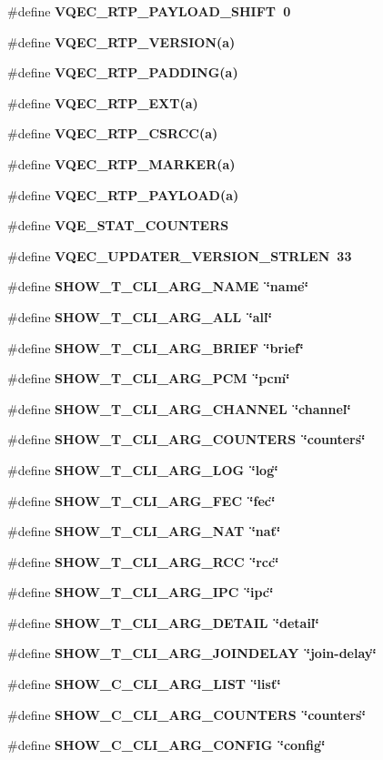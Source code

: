 \begin{CompactItemize}
\#define \bf{VQEC\_\-RTP\_\-PAYLOAD\_\-SHIFT}~0
\item 
\#define \bf{VQEC\_\-RTP\_\-VERSION}(a)
\item 
\#define \bf{VQEC\_\-RTP\_\-PADDING}(a)
\item 
\#define \bf{VQEC\_\-RTP\_\-EXT}(a)
\item 
\#define \bf{VQEC\_\-RTP\_\-CSRCC}(a)
\item 
\#define \bf{VQEC\_\-RTP\_\-MARKER}(a)
\item 
\#define \bf{VQEC\_\-RTP\_\-PAYLOAD}(a)
\item 
\#define \bf{VQE\_\-STAT\_\-COUNTERS}
\item 
\#define \bf{VQEC\_\-UPDATER\_\-VERSION\_\-STRLEN}~33
\item 
\#define \bf{SHOW\_\-T\_\-CLI\_\-ARG\_\-NAME}~\char`\"{}name\char`\"{}
\item 
\#define \bf{SHOW\_\-T\_\-CLI\_\-ARG\_\-ALL}~\char`\"{}all\char`\"{}
\item 
\#define \bf{SHOW\_\-T\_\-CLI\_\-ARG\_\-BRIEF}~\char`\"{}brief\char`\"{}
\item 
\#define \bf{SHOW\_\-T\_\-CLI\_\-ARG\_\-PCM}~\char`\"{}pcm\char`\"{}
\item 
\#define \bf{SHOW\_\-T\_\-CLI\_\-ARG\_\-CHANNEL}~\char`\"{}channel\char`\"{}
\item 
\#define \bf{SHOW\_\-T\_\-CLI\_\-ARG\_\-COUNTERS}~\char`\"{}counters\char`\"{}
\item 
\#define \bf{SHOW\_\-T\_\-CLI\_\-ARG\_\-LOG}~\char`\"{}log\char`\"{}
\item 
\#define \bf{SHOW\_\-T\_\-CLI\_\-ARG\_\-FEC}~\char`\"{}fec\char`\"{}
\item 
\#define \bf{SHOW\_\-T\_\-CLI\_\-ARG\_\-NAT}~\char`\"{}nat\char`\"{}
\item 
\#define \bf{SHOW\_\-T\_\-CLI\_\-ARG\_\-RCC}~\char`\"{}rcc\char`\"{}
\item 
\#define \bf{SHOW\_\-T\_\-CLI\_\-ARG\_\-IPC}~\char`\"{}ipc\char`\"{}
\item 
\#define \bf{SHOW\_\-T\_\-CLI\_\-ARG\_\-DETAIL}~\char`\"{}detail\char`\"{}
\item 
\#define \bf{SHOW\_\-T\_\-CLI\_\-ARG\_\-JOINDELAY}~\char`\"{}join-delay\char`\"{}
\item 
\#define \bf{SHOW\_\-C\_\-CLI\_\-ARG\_\-LIST}~\char`\"{}list\char`\"{}
\item 
\#define \bf{SHOW\_\-C\_\-CLI\_\-ARG\_\-COUNTERS}~\char`\"{}counters\char`\"{}
\item 
\#define \bf{SHOW\_\-C\_\-CLI\_\-ARG\_\-CONFIG}~\char`\"{}config\char`\"{}

\end{CompactItemize}
